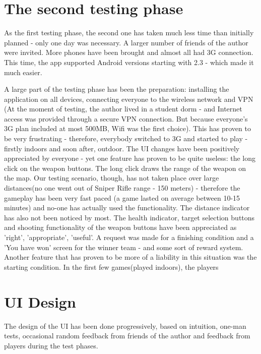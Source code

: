 \documentclass{article}
\begin{document}
\section{The second testing phase}

As the first testing phase, the second one has taken much less time than
initially planned - only one day was necessary. A larger number of friends of
the author were invited. More phones have been brought and almost all had 3G
connection. This time, the app supported Android versions starting with 2.3
- which made it much easier.\newline

A large part of the testing phase has been the preparation: installing the
application on all devices, connecting everyone to the wireless network and VPN
(At the moment of testing, the author lived in a student dorm - and Internet
access was provided through a secure VPN connection. But because everyone's 3G
plan included at most 500MB, Wifi was the first choice). This has proven to be
very frustrating - therefore, everybody switched to 3G and started to play -
firstly indoors and soon after, outdoor. The UI changes have been positively
appreciated by everyone - yet one feature has proven to be quite useless: the
long click on the weapon buttons. The long click draws the range of the weapon
on the map. Our testing scenario, though, has not taken place over large
distances(no one went out of Sniper Rifle range - 150 meters) - therefore the
gameplay has been very fast paced (a game lasted on average between 10-15
minutes) and no-one has actually used the functionality. The distance indicator
has also not been noticed by most. The health indicator, target selection
buttons and shooting functionality of the weapon buttons have been appreciated
as 'right', 'appropriate', 'useful'. A request was made for a finishing
condition and a 'You have won' screen for the winner team - and some sort of
reward system. Another feature that has proven to be more of a liability in this
situation was the starting condition. In the first few games(played indoors),
the players 

\section{UI Design}

The design of the UI has been done progressively, based on intuition, one-man
tests, occasional random feedback from friends of the author and feedback from
players during the test phases.\newline
\end{document}
